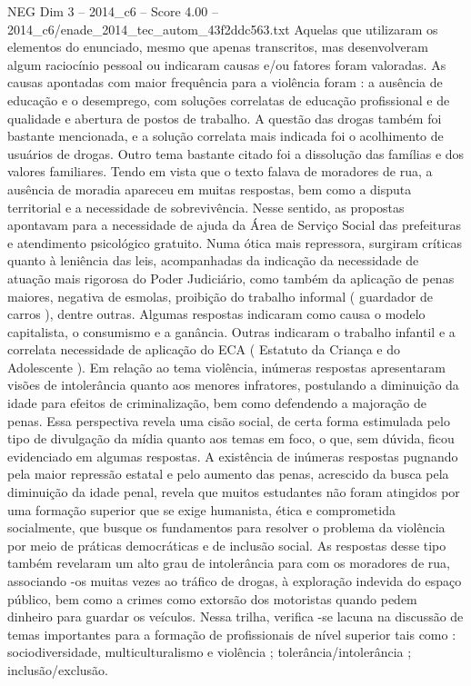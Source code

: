 \begin{textsample}{NEG Dim 3 – 2014\_c6 – Score 4.00 – 2014\_c6/enade\_2014\_tec\_autom\_43f2ddc563.txt}
Aquelas que utilizaram os elementos do enunciado, mesmo que apenas transcritos, mas desenvolveram algum raciocínio pessoal ou indicaram causas e/ou fatores foram valoradas.
As causas apontadas com maior frequência para a violência foram : a ausência de educação e o desemprego, com soluções correlatas de educação profissional e de qualidade e abertura de postos de trabalho.
A questão das drogas também foi bastante mencionada, e a solução correlata mais indicada foi o acolhimento de usuários de drogas.
Outro tema bastante citado foi a dissolução das famílias e dos valores familiares.
Tendo em vista que o texto falava de moradores de rua, a ausência de moradia apareceu em muitas respostas, bem como a disputa territorial e a necessidade de sobrevivência.
Nesse sentido, as propostas apontavam para a necessidade de ajuda da Área de Serviço Social das prefeituras e atendimento psicológico gratuito.
Numa ótica mais repressora, surgiram críticas quanto à leniência das leis, acompanhadas da indicação da necessidade de atuação mais rigorosa do Poder Judiciário, como também da aplicação de penas maiores, negativa de esmolas, proibição do trabalho informal ( guardador de carros ), dentre outras.
Algumas respostas indicaram como causa o modelo capitalista, o consumismo e a ganância.
Outras indicaram o trabalho infantil e a correlata necessidade de aplicação do ECA ( Estatuto da Criança e do Adolescente ).
Em relação ao tema violência, inúmeras respostas apresentaram visões de intolerância quanto aos menores infratores, postulando a diminuição da idade para efeitos de criminalização, bem como defendendo a majoração de penas.
Essa perspectiva revela uma cisão social, de certa forma estimulada pelo tipo de divulgação da mídia quanto aos temas em foco, o que, sem dúvida, ficou evidenciado em algumas respostas.
A existência de inúmeras respostas pugnando pela maior repressão estatal e pelo aumento das penas, acrescido da busca pela diminuição da idade penal, revela que muitos estudantes não foram atingidos por uma formação superior que se exige humanista, ética e comprometida socialmente, que busque os fundamentos para resolver o problema da violência por meio de práticas democráticas e de inclusão social.
As respostas desse tipo também revelaram um alto grau de intolerância para com os moradores de rua, associando -os muitas vezes ao tráfico de drogas, à exploração indevida do espaço público, bem como a crimes como extorsão dos motoristas quando pedem dinheiro para guardar os veículos.
Nessa trilha, verifica -se lacuna na discussão de temas importantes para a formação de profissionais de nível superior tais como : sociodiversidade, multiculturalismo e violência ; tolerância/intolerância ; inclusão/exclusão.

\end{textsample}
